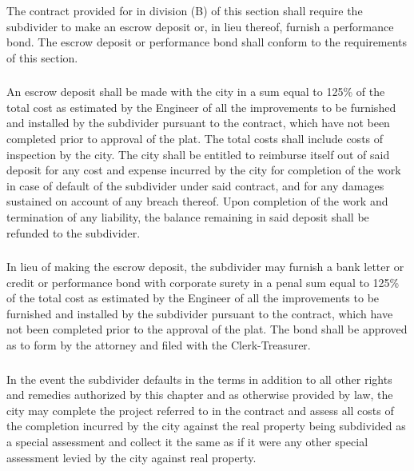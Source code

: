 \subsubsection{}
The contract provided for in division (B) of this section shall require the subdivider to make an escrow deposit or, in lieu thereof, furnish a performance bond. The escrow deposit or performance bond shall conform to the requirements of this section.
\subsubsection{}
An escrow deposit shall be made with the city in a sum equal to 125\% of the total cost as estimated by the Engineer of all the improvements to be furnished and installed by the subdivider pursuant to the contract, which have not been completed prior to approval of the plat. The total costs shall include costs of inspection by the city. The city shall be entitled to reimburse itself out of said deposit for any cost and expense incurred by the city for completion of the work in case of default of the subdivider under said contract, and for any damages sustained on account of any breach thereof.  Upon completion of the work and termination of any liability, the balance remaining in said deposit shall be refunded to the subdivider.
\subsubsection{}
In lieu of making the escrow deposit, the subdivider may furnish a bank letter or credit or performance bond with corporate surety in a penal sum equal to 125\% of the total cost as estimated by the Engineer of all the improvements to be furnished and installed by the subdivider pursuant to the contract, which have not been completed prior to the approval of the plat. The bond shall be approved as to form by the attorney and filed with the Clerk-Treasurer.
\subsubsection{}
In the event the subdivider defaults in the terms in addition to all other rights and remedies authorized by this chapter and as otherwise provided by law, the city may complete the project referred to in the contract and assess all costs of the completion incurred by the city against the real property being subdivided as a special assessment and collect it the same as if it were any other special assessment levied by the city against real property.
